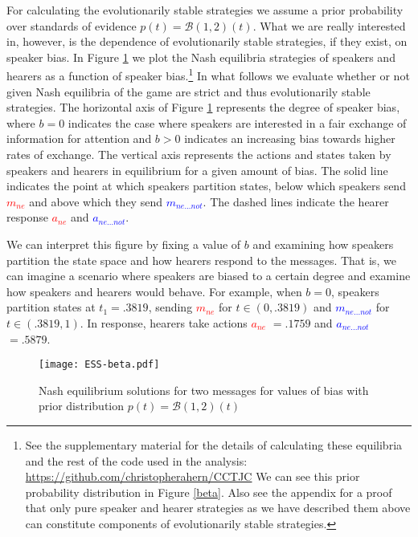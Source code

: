 \documentclass[linguex]{sp}
\theoremstyle{definition} \newtheorem{definition}{Definition}
\begin{document}
For calculating the evolutionarily stable strategies we assume a prior probability over standards of evidence $p(t) = \mathcal{B}(1,2)(t)$.  What we are really interested in, however, is the dependence of evolutionarily stable strategies, if they exist, on speaker bias. In Figure \ref{ESS-beta} we plot the Nash equilibria strategies of speakers and hearers as a function of speaker bias.\footnote{See the supplementary material for the details of calculating these equilibria and the rest of the code used in the analysis: \url{https://github.com/christopherahern/CCTJC} We can see this prior probability distribution in Figure \ref{beta}. Also see the appendix for a proof that only pure speaker and hearer strategies as we have described them above can constitute components of evolutionarily stable strategies.}  In what follows we evaluate whether or not given Nash equilibria of the game are strict and thus evolutionarily stable strategies. The horizontal axis of Figure \ref{ESS-beta} represents the degree of speaker bias, where $b=0$ indicates the case where speakers are interested in a fair exchange of information for attention and $b > 0$ indicates an increasing bias towards higher rates of exchange. The vertical axis represents the actions and states taken by speakers and hearers in equilibrium for a given amount of bias. The solid line indicates the point at which speakers partition states, below which speakers send \emph{\textcolor{red}{$m_{ne}$}} and above which they send \emph{\textcolor{blue}{$m_{ne...not}$}}. The dashed lines indicate the hearer response \emph{\textcolor{red}{$a_{ne}$}} and \emph{\textcolor{blue}{$a_{ne...not}$}}.  

We can interpret this figure by fixing a value of $b$ and examining how speakers partition the state space and how hearers respond to the messages.  That is, we can imagine a scenario where speakers are biased to a certain degree and examine how speakers and hearers would behave. For example, when $b=0$, speakers partition states at $t_1 = .3819$, sending \emph{\textcolor{red}{$m_{ne}$}} for $t \in (0, .3819)$ and \emph{\textcolor{blue}{$m_{ne...not}$}} for $t \in (.3819, 1)$. In response, hearers take actions \emph{\textcolor{red}{$a_{ne}$}} $=.1759$ and \emph{\textcolor{blue}{$a_{ne...not}$}} $ =.5879$. 

\begin{figure}
\begin{center}
	\texttt{[image: ESS-beta.pdf]}
	\caption{Nash equilibrium solutions for two messages for values of bias with prior distribution $p(t) = \mathcal{B}(1,2)(t)$}
	\label{ESS-beta}
\end{center}
\end{figure}
\end{document}
